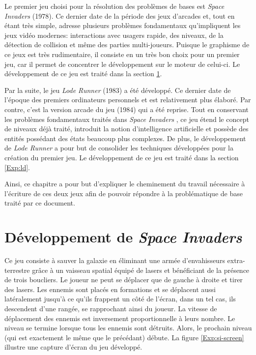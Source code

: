 \documentclass[12pt,oneside,letterpaper,francais]{book}
\newcommand{\lr}{{\textit{Lode Runner }}}
\newcommand{\si}{{\textit{Space Invaders }}}
\begin{document}
Le premier jeu choisi pour la résolution des problèmes de bases est
\si (1978). Ce dernier date de la période des jeux d'arcades et, tout
en étant très simple, adresse plusieurs problèmes fondamentaux
qu'impliquent les jeux vidéo modernes: interactions avec usagers
rapide, des niveaux, de la détection de collision et même des parties
multi-joueurs. Puisque le graphisme de ce jeux est très rudimentaire,
il consiste en un très bon choix pour un premier jeu, car il permet de
concentrer le développement sur le moteur de celui-ci. Le
développement de ce jeu est traité dans la section \ref{Exp:SI}.

Par la suite, le jeu \lr (1983) a été développé. Ce dernier date de
l'époque des premiers ordinateurs personnels et est relativement plus
élaboré. Par contre, c'est la version arcade du jeu (1984) qui a été
reprise. Tout en conservant les problèmes fondamentaux traités dans
\si, ce jeu étend le concept de niveaux déjà traité, introduit la
notion d'intelligence artificielle et possède des entités possédant
des états beaucoup plus complexes. De plus, le développement de \lr a
pour but de consolider les techniques développées pour la création du
premier jeu. Le développement de ce jeu est traité dans la section
\ref{Exp:ld}.

Ainsi, ce chapitre a pour but d'expliquer le cheminement du travail
nécessaire à l'écriture de ces deux jeux afin de pouvoir répondre à la
problématique de base traité par ce document.

\section{Développement de \si}
\label{Exp:SI}

Ce jeu consiste à sauver la galaxie en éliminant une armée
d'envahisseurs extra-terrestre grâce à un vaisseau spatial équipé de
lasers et bénéficiant de la présence de trois boucliers. Le joueur ne
peut se déplacer que de gauche à droite et tirer des lasers. Les
ennemis sont placés en formations et se déplacent aussi latéralement
jusqu'à ce qu'ils frappent un côté de l'écran, dans un tel cas, ils
descendent d'une rangée, se rapprochant ainsi du joueur. La vitesse de
déplacement des ennemis est inversement proportionnelle à leurs
nombre. Le niveau se termine lorsque tous les ennemis sont
détruits. Alors, le prochain niveau (qui est exactement le même que le
précédant) débute. La figure \ref{Exp:si-screen} illustre une capture
d'écran du jeu développé.
\end{document}

